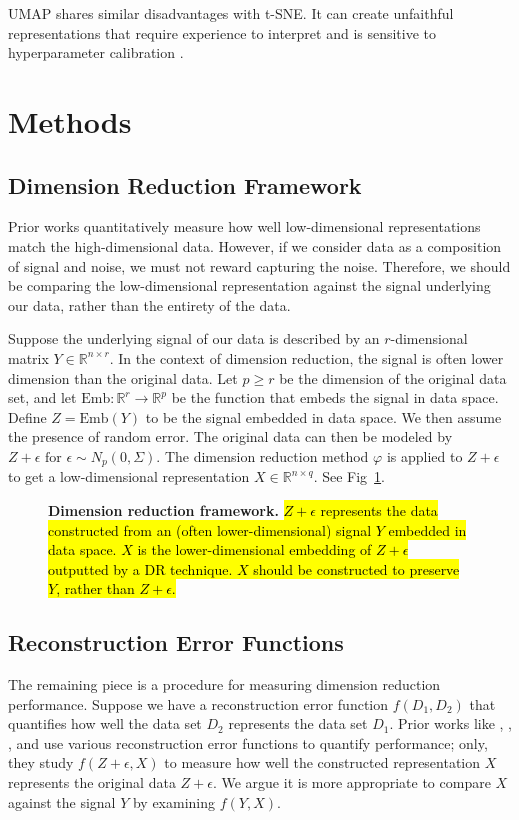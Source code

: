 \documentclass[10pt,letterpaper]{article}
\begin{document}
UMAP shares similar disadvantages with t-SNE. It can create unfaithful representations that require experience to interpret and is sensitive to hyperparameter calibration \cite{understanding UMAP}.

\section*{Methods}

\subsection*{Dimension Reduction Framework}
Prior works quantitatively measure how well low-dimensional representations match the high-dimensional data. However, if we consider data as a composition of signal and noise, we must not reward capturing the noise. Therefore, we should be comparing the low-dimensional representation against the signal underlying our data, rather than the entirety of the data.

Suppose the underlying signal of our data is described by an $r$-dimensional matrix $Y \in \mathbb{R}^{n \times r}$. In the context of dimension reduction, the signal is often lower dimension than the original data. Let $p \geq r$ be the dimension of the original data set, and let $\textrm{Emb}:\mathbb{R}^r \to \mathbb{R}^p$ be the function that embeds the signal in data space. Define $Z = \textrm{Emb}(Y)$ to be the signal embedded in data space. We then assume the presence of random error. The original data can then be modeled by $Z + \epsilon \textrm{ for } \epsilon \sim N_p(0, \Sigma)$. The dimension reduction method $\varphi$ is applied to $Z + \epsilon$ to get a low-dimensional representation $X \in \mathbb{R}^{n \times q}$. See Fig~\ref{fig1}.

\begin{figure}[!h]
\caption{{\bf Dimension reduction framework.}
\hl{$Z + \epsilon$ represents the data constructed from an (often lower-dimensional) signal $Y$ embedded in data space. $X$ is the lower-dimensional embedding of $Z + \epsilon$ outputted by a DR technique. $X$ should be constructed to preserve $Y$, rather than $Z + \epsilon$.}}
\label{fig1}
\end{figure}

\subsection*{Reconstruction Error Functions}
The remaining piece is a procedure for measuring dimension reduction performance. Suppose we have a reconstruction error function $f(D_1, D_2)$ that quantifies how well the data set $D_2$ represents the data set $D_1$. Prior works like \cite{evaluation of DR transcriptomics}, \cite{t-SNE cell} , \cite{large DR unreliable}, and \cite{quantitative survey} use various reconstruction error functions to quantify performance; only, they study $f(Z + \epsilon, X)$ to measure how well the constructed representation $X$ represents the original data $Z + \epsilon$. We argue it is more appropriate to compare $X$ against the signal $Y$ by examining $f(Y, X)$.
\end{document}
